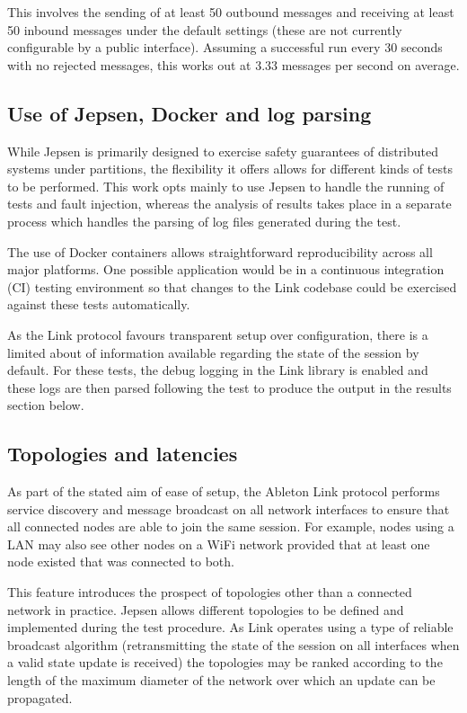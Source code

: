 \documentclass[11pt]{article} %
\theoremstyle{plain}
\theoremstyle{definition}
\begin{document}
This involves the sending of at least 50 outbound messages and receiving at
least 50 inbound messages under the default settings (these are not
currently configurable by a public interface). Assuming a successful run every
30 seconds with no rejected messages, this works out at 3.33 messages per
second on average.

\subsection{Use of Jepsen, Docker and log parsing}

While Jepsen is primarily designed to exercise safety guarantees of distributed
systems under partitions, the flexibility it offers allows for different kinds
of tests to be performed. This work opts mainly to use Jepsen to handle the
running of tests and fault injection, whereas the analysis of results takes
place in a separate process which handles the parsing of log files generated
during the test.

The use of Docker containers allows straightforward reproducibility across all
major platforms. One possible application would be in a continuous integration
(CI) testing environment so that changes to the Link codebase could be
exercised against these tests automatically.

As the Link protocol favours transparent setup over configuration, there is a
limited about of information available regarding the state of the session by
default. For these tests, the debug logging in the Link library is enabled and
these logs are then parsed following the test to produce the output in the
results section below.

\subsection{Topologies and latencies}

As part of the stated aim of ease of setup, the Ableton Link protocol performs
service discovery and message broadcast on all network interfaces to ensure
that all connected nodes are able to join the same session. For example, nodes
using a LAN may also see other nodes on a WiFi network provided that at least
one node existed that was connected to both.

This feature introduces the prospect of topologies other than a connected
network in practice. Jepsen allows different topologies to be defined and
implemented during the test procedure. As Link operates using a type of
reliable broadcast algorithm (retransmitting the state of the session on all
interfaces when a valid state update is received) the topologies may be ranked
according to the length of the maximum diameter of the network over which an
update can be propagated.
\end{document}
